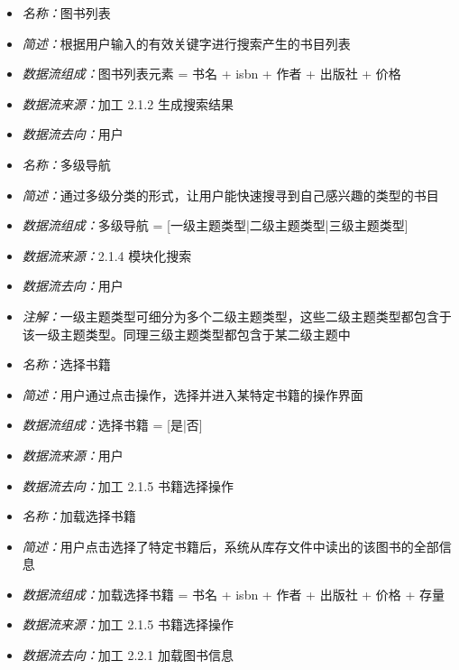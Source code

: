 \vspace{-1mm}

\begin{itemize}
	\item \textit{名称：}图书列表
	\item \textit{简述：}根据用户输入的有效关键字进行搜索产生的书目列表
	\item \textit{数据流组成：}图书列表元素 = 书名 + isbn + 作者 + 出版社 + 价格
	\item \textit{数据流来源：}加工 2.1.2 生成搜索结果
	\item \textit{数据流去向：}用户
\end{itemize}

\vspace{-1mm}

\begin{itemize}
	\item \textit{名称：}多级导航
	\item \textit{简述：}通过多级分类的形式，让用户能快速搜寻到自己感兴趣的类型的书目
	\item \textit{数据流组成：}多级导航 = [一级主题类型|二级主题类型|三级主题类型]
	\item \textit{数据流来源：}2.1.4 模块化搜索
	\item \textit{数据流去向：}用户
	\item \textit{注解：}一级主题类型可细分为多个二级主题类型，这些二级主题类型都包含于该一级主题类型。同理三级主题类型都包含于某二级主题中
\end{itemize}

\vspace{-1mm}

\begin{itemize}
	\item \textit{名称：}选择书籍
	\item \textit{简述：}用户通过点击操作，选择并进入某特定书籍的操作界面
	\item \textit{数据流组成：}选择书籍 = [是|否]
	\item \textit{数据流来源：}用户
	\item \textit{数据流去向：}加工 2.1.5 书籍选择操作
\end{itemize}

\vspace{-1mm}

\begin{itemize}
	\item \textit{名称：}加载选择书籍
	\item \textit{简述：}用户点击选择了特定书籍后，系统从库存文件中读出的该图书的全部信息
	\item \textit{数据流组成：}加载选择书籍 = 书名 + isbn + 作者 + 出版社 + 价格 + 存量
	\item \textit{数据流来源：}加工 2.1.5 书籍选择操作
	\item \textit{数据流去向：}加工 2.2.1 加载图书信息
\end{itemize}


